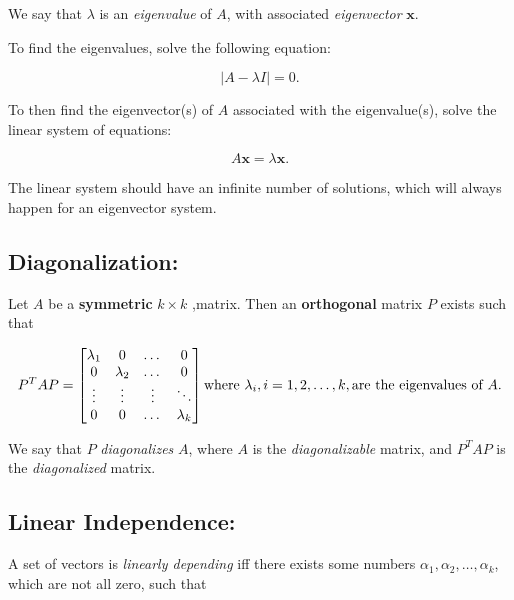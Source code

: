 \documentclass[12pt]{article}
\begin{document}
We say that $\lambda$ is an \textit{eigenvalue} of $A$, with associated \textit{eigenvector} $\mathbf{x}$.

To find the eigenvalues, solve the following equation:

\begin{equation}
    |A - \lambda I| = 0.
\end{equation}

To then find the eigenvector(s) of $A$ associated with the eigenvalue(s), solve the linear system of equations:

\begin{equation}
    A\mathbf{x} = \lambda\mathbf{x}.
\end{equation}

The linear system should have an infinite number of solutions, which will always happen for an eigenvector system.


\subsection{Diagonalization:}

Let $A$ be a \textbf{symmetric} $k\times k$ ,matrix. Then an \textbf{orthogonal} matrix $P$ exists such that

\begin{equation}
    P^TAP = \begin{bmatrix} \lambda_1 & 0  & \dots  & 0 \\ 0 & \lambda_2  & \dots  & 0 \\ \vdots & \vdots & \vdots & \ddots \\ 0 & 0 & \dots & \lambda_k \end{bmatrix}\\
    \textrm{where }\lambda_i, i = 1, 2, \dots, k, \textrm{are the eigenvalues of } A.
\end{equation}

We say that $P$ \textit{diagonalizes} $A$, where $A$ is the \textit{diagonalizable} matrix, and $P^TAP$ is the \textit{diagonalized} matrix.

\subsection{Linear Independence:}
A set of vectors is \textit{linearly depending} iff there exists some numbers $\alpha_1, \alpha_2, \dots, \alpha_k$, which are not all zero, such that
\end{document}
